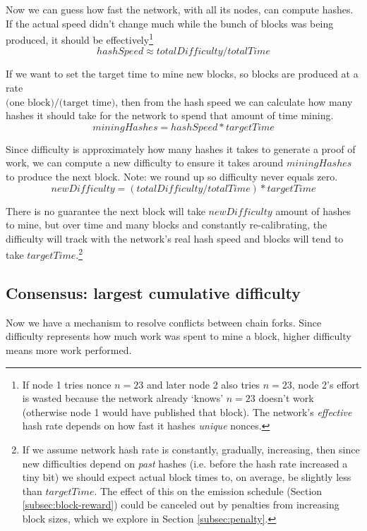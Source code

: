 Now we can guess how fast the network, with all its nodes, can compute hashes. If the actual speed didn't change much while the bunch of blocks was being produced, it should be effectively\footnote{If node 1 tries nonce $n = 23$ and later node 2 also tries $n = 23$, node 2's effort is wasted because the network already `knows' $n = 23$ doesn't work (otherwise node 1 would have published that block). The network's {\em effective} hash rate depends on how fast it hashes {\em unique} nonces.}
\[ \mathit{hashSpeed} \approx \mathit{totalDifficulty}/\mathit{totalTime} \]

If we want to set the target time to mine new blocks, so blocks are produced at a rate\\ \(\textrm{(one block)/(target time)}\), then from the hash speed we can calculate how many hashes it should take for the network to spend that amount of time mining.
\[ \mathit{miningHashes} = \mathit{hashSpeed}*\mathit{targetTime} \]

Since difficulty is approximately how many hashes it takes to generate a proof of work, we can compute a new difficulty to ensure it takes around $\mathit{miningHashes}$ to produce the next block. Note: we round up so difficulty never equals zero.
\[ \mathit{newDifficulty} = (\mathit{totalDifficulty}/\mathit{totalTime})*\mathit{targetTime}\]

There is no guarantee the next block will take $\mathit{newDifficulty}$ amount of hashes to mine, but over time and many blocks and constantly re-calibrating, the difficulty will track with the network's real hash speed and blocks will tend to take $\mathit{targetTime}$.\footnote{If we assume network hash rate is constantly, gradually, increasing, then since new difficulties depend on {\em past} hashes (i.e. before the hash rate increased a tiny bit) we should expect actual block times to, on average, be slightly less than $\mathit{targetTime}$. The effect of this on the emission schedule (Section \ref{subsec:block-reward}) could be canceled out by penalties from increasing block sizes, which we explore in Section \ref{subsec:penalty}.}


\subsection{Consensus: largest cumulative difficulty}

Now we have a mechanism to resolve conflicts between chain forks. Since difficulty represents how much work was spent to mine a block, higher difficulty means more work performed.

